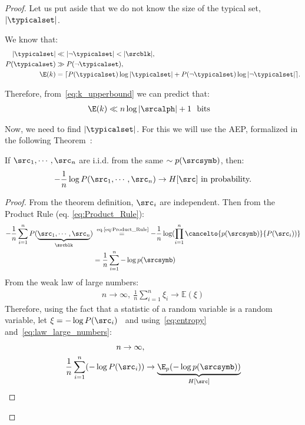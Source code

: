 \begin{proof}
	Let us put aside that we do not know the size of the typical set, \(|\typicalset|\).

	We know that:
	\begin{align}
		|\typicalset| &\ll |\neg \typicalset| < |\srcblk |, \\
		P(\typicalset)&\gg P(\neg \typicalset ),\\
		\E(k) &= \lceil P(\typicalset)\log|\typicalset| + P(\neg \typicalset )\log |\neg \typicalset|\rceil.
	\end{align}

	Therefore, from~\eqref{eq:k_upperbound} we can predict that:
	\begin{align}
		\E(k) &\ll  n \log |\srcalph|+1~\text{ bits}
	\end{align}

	Now, we need to find \(|\typicalset|\). For this we will use the \acf{AEP}, formalized in the following Theorem~\cite{cover:2006}:
	\begin{theorem}[\ac{AEP}]\label{th:aep}
		If \(\src_1, \cdots, \src_n\) are i.i.d. from the same \(\sim p(\srcsymb)\), then:
		\begin{align}
			-\frac{1}{n}\log P(\src_1, \cdots, \src_n) \to H[\src] \text{ in probability.}
		\end{align}
	\end{theorem}
	\begin{proof}
		From the theorem definition,  \(\src_i\) are independent. Then from the Product Rule (eq. \ref{eq:Product_Rule}):
		\begin{align}
			- \frac{1}{n} \sum_{i=1}^{n}P(\underbrace{\src_1, \cdots, \src_n}_{\srcblk}) &\overset{\text{~eq.\ref{eq:Product_Rule}}}{=} -\frac{1}{n} \log(\prod_{i=1}^{n} \cancelto{p(\srcsymb)}{P(\src_i))}\\
			&=\frac{1}{n} \sum_{i=1}^{n} -\log p(\srcsymb)
		\end{align}
		From the weak law of large numbers:
		\begin{align}
		 n \to \infty,~\frac{1}{n} \sum_{i=1}^{n}\xi_i \to \mathbb{E}(\xi) \label{eq:law_large_numbers}
		\end{align}
		Therefore, using the fact that a statistic of a random variable is a random variable, let \(\xi=- \log P(\src_i)\)~\cite{cover:2006} and using~\eqref{eq:entropy} and~\eqref{eq:law_large_numbers}:
		\begin{align}
			n \to \infty,& \nonumber\\
			\frac{1}{n} \sum_{i=1}^{n}(- \log P(\src_i))
			&\to \underbrace{\E_p (- \log p(\srcsymb))}_{H[\src]}\\

\end{align}
\end{proof}
\end{proof}
